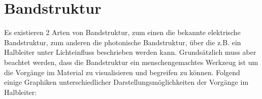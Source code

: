 \section{Bandstruktur}
	Es existieren 2 Arten von Bandstruktur, zum einen die bekannte elektrische Bandstruktur, zum anderen die photonische Bandstruktur, über die z.B. ein Halbleiter unter Lichteinfluss beschrieben werden kann. Grundsätzlich muss aber beachtet werden, dass die Bandstruktur ein menschengemachtes Werkzeug ist um die Vorgänge im Material zu visualisieren und begreifen zu können. Folgend einige Graphiken unterschiedlicher Darstellungsmöglichkeiten der Vorgänge im Halbleiter:
\begin{figure}[H]
	\begin{minipage}{.5\linewidth}
		\centering
	\end{minipage}%
	\begin{minipage}{.5\linewidth}
		\centering

\end{minipage}
\end{figure}
